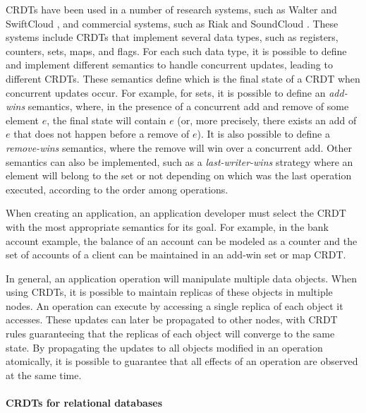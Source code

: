 CRDTs have been used in a number of research systems, such as Walter \cite{walter}
and SwiftCloud \cite{Zawirski15Write},
and commercial systems, such as Riak \cite{riak} and SoundCloud \cite{soundcloud}.
These systems include CRDTs that implement several data types, such as
registers, counters, sets, maps, and flags. For each such data type, it is possible to define and implement different semantics
to handle concurrent updates, leading to different CRDTs.
These semantics define which is the final state of a CRDT when
concurrent updates occur.
For example, for sets, it is possible to define an \emph{add-wins} semantics,
where, in the presence of a concurrent add and remove of some element $e$,
the final state will contain $e$ (or, more precisely, there exists an add of $e$
that does not happen before a remove of $e$).
It is also possible to define a \emph{remove-wins} semantics, where the remove will
win over a concurrent add.
Other semantics can also be implemented, such as a \emph{last-writer-wins} strategy where
an element will belong to the set or not depending on which was the last operation
executed, according to the order among operations.

When creating an application, an application developer must select the CRDT
with the most appropriate semantics for its goal.
For example, in the bank account example, the balance of an account can be modeled
as a counter and the set of accounts of a client can be maintained in an add-win set or map CRDT.

In general, an application operation will manipulate multiple data objects.
When using CRDTs, it is possible to maintain replicas of these objects in multiple nodes.
An operation can execute by accessing a single replica of each object it accesses.
These updates can later be propagated to other nodes, with CRDT rules guaranteeing
that the replicas of each object will converge to the same state.
By propagating the updates to all objects modified in an operation atomically,
it is possible to guarantee that all effects of an operation are observed at the
same time.

\paragraph{CRDTs for relational databases}

